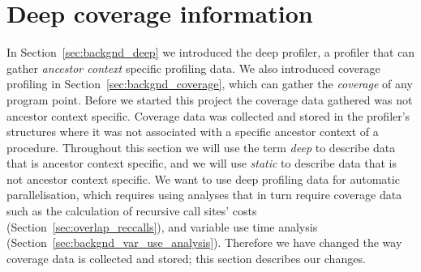 \section{Deep coverage information}
\label{sec:overlap_coverage}


In Section~\ref{sec:backgnd_deep} we introduced the deep profiler,
a profiler that can gather \emph{ancestor context} specific profiling data.
We also introduced coverage profiling in Section~\ref{sec:backgnd_coverage},
which can gather the \emph{coverage} of any program point.
Before we started this project the coverage data gathered was not ancestor
context specific.
Coverage data was collected and stored in the profiler's \PS
structures where it was not associated with a specific ancestor context of
a procedure.
Throughout this section we will use the term \emph{deep} to describe data
that is ancestor context specific,
and we will use \emph{static} to describe data that is not ancestor
context specific.
We want to use deep profiling data for automatic parallelisation,
which requires using analyses that in turn require coverage data such as
the calculation of recursive call sites' costs
(Section~\ref{sec:overlap_reccalls}),
and variable use time analysis (Section~\ref{sec:backgnd_var_use_analysis}).
Therefore we have changed the way coverage data is collected and stored;
this section describes our changes.

